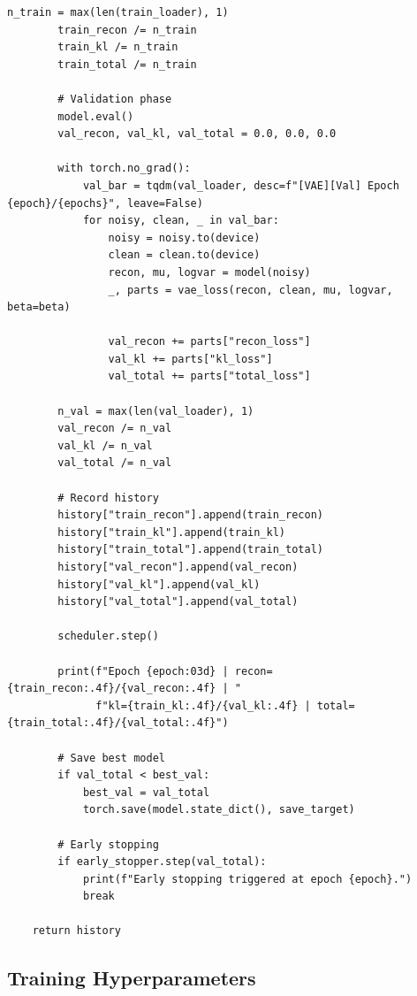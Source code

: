 \documentclass[11pt,a4paper]{article}
\begin{document}
\begin{lstlisting}[caption={src/train\_vae.py - Training Function}, label={lst:train-vae}]
        n_train = max(len(train_loader), 1)
        train_recon /= n_train
        train_kl /= n_train
        train_total /= n_train

        # Validation phase
        model.eval()
        val_recon, val_kl, val_total = 0.0, 0.0, 0.0

        with torch.no_grad():
            val_bar = tqdm(val_loader, desc=f"[VAE][Val] Epoch {epoch}/{epochs}", leave=False)
            for noisy, clean, _ in val_bar:
                noisy = noisy.to(device)
                clean = clean.to(device)
                recon, mu, logvar = model(noisy)
                _, parts = vae_loss(recon, clean, mu, logvar, beta=beta)

                val_recon += parts["recon_loss"]
                val_kl += parts["kl_loss"]
                val_total += parts["total_loss"]

        n_val = max(len(val_loader), 1)
        val_recon /= n_val
        val_kl /= n_val
        val_total /= n_val

        # Record history
        history["train_recon"].append(train_recon)
        history["train_kl"].append(train_kl)
        history["train_total"].append(train_total)
        history["val_recon"].append(val_recon)
        history["val_kl"].append(val_kl)
        history["val_total"].append(val_total)

        scheduler.step()

        print(f"Epoch {epoch:03d} | recon={train_recon:.4f}/{val_recon:.4f} | "
              f"kl={train_kl:.4f}/{val_kl:.4f} | total={train_total:.4f}/{val_total:.4f}")

        # Save best model
        if val_total < best_val:
            best_val = val_total
            torch.save(model.state_dict(), save_target)

        # Early stopping
        if early_stopper.step(val_total):
            print(f"Early stopping triggered at epoch {epoch}.")
            break

    return history
\end{lstlisting}

\subsection{Training Hyperparameters}
\end{document}
